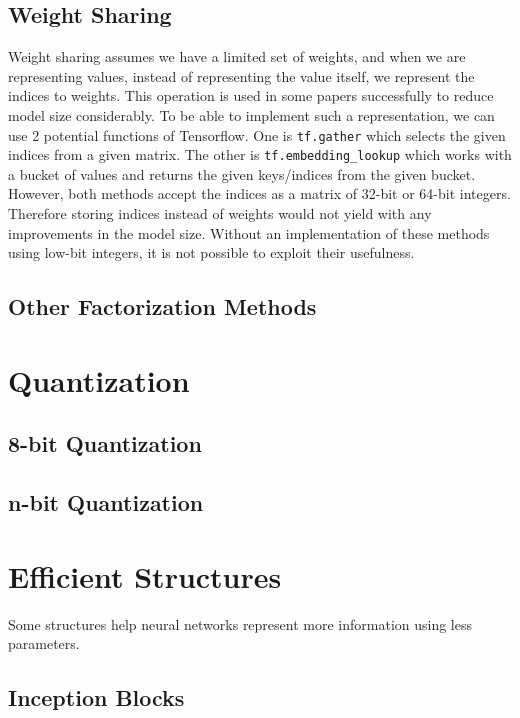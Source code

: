 \subsection{Weight Sharing}
Weight sharing assumes we have a limited set of weights, and when we are representing values, instead of representing the value itself, we represent the indices to weights. This operation is used in some papers successfully to reduce model size considerably. To be able to implement such a representation, we can use 2 potential functions of Tensorflow. One is \texttt{tf.gather} which selects the given indices from a given matrix. The other is \texttt{tf.embedding\_lookup} which works with a bucket of values and returns the given keys/indices from the given bucket. However, both methods accept the indices as a matrix of 32-bit or 64-bit integers. Therefore storing indices instead of weights would not yield with any improvements in the model size. Without an implementation of these methods using low-bit integers, it is not possible to exploit their usefulness.

\subsection{Other Factorization Methods}


\section{Quantization}

\subsection{8-bit Quantization}
\subsection{n-bit Quantization}

\section{Efficient Structures}
Some structures help neural networks represent more information using less parameters.

\subsection{Inception Blocks}
